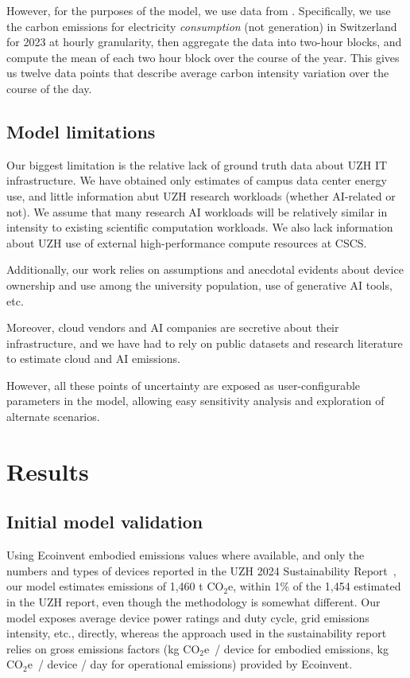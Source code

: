 \documentclass[11pt]{article}
\newcommand{\coe}{CO$_2$e}
\newcommand{\gcoe}{g \coe}
\newcommand{\kgcoe}{k\gcoe}
\begin{document}
However, for the purposes of the model, we use data from \textcite{electricitymaps}. Specifically, we use the carbon emissions for electricity {\em consumption} (not generation) in Switzerland for 2023 at hourly granularity, then aggregate the data into two-hour blocks, and compute the mean of each two hour block over the course of the year. This gives us twelve data points that describe average carbon intensity variation over the course of the day.

\subsection{Model limitations}

Our biggest limitation is the relative lack of ground truth data about UZH IT infrastructure. We have obtained only estimates of campus data center energy use, and little information abut UZH research workloads (whether AI-related or not). We assume that many research AI workloads will be relatively similar in intensity to existing scientific computation workloads. We also lack information about UZH use of external high-performance compute resources at CSCS.

Additionally, our work relies on assumptions and anecdotal evidents about device ownership and use among the university population, use of generative AI tools, etc.

Moreover, cloud vendors and AI companies are secretive about their infrastructure, and we have had to rely on public datasets and research literature to estimate cloud and AI emissions.

However, all these points of uncertainty are exposed as user-configurable parameters in the model, allowing easy sensitivity analysis and exploration of alternate scenarios.

\section{Results}
\label{sec:results}

\subsection{Initial model validation}

Using Ecoinvent embodied emissions values where available, and only the numbers and types of devices reported in the UZH 2024 Sustainability Report~\cite{uzh:sustainability:report}, our model estimates emissions of 1,460 t \coe, within 1\% of the 1,454 estimated in the UZH report, even though the methodology is somewhat different. Our model exposes average device power ratings and duty cycle, grid emissions intensity, etc., directly, whereas the approach used in the sustainability report relies on gross emissions factors (\kgcoe\ / device for embodied emissions, \kgcoe\ / device / day for operational emissions) provided by Ecoinvent.
\end{document}
